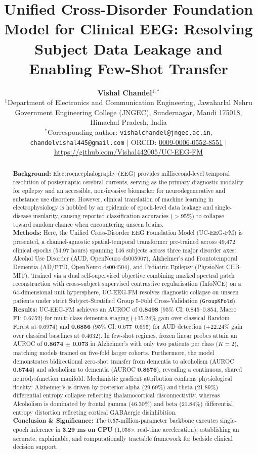 \documentclass[11pt,a4paper]{article}
\title{\textbf{\Large Unified Cross-Disorder Foundation Model for Clinical EEG: Resolving Subject Data Leakage and Enabling Few-Shot Transfer}}
\author{
    \textbf{Vishal Chandel}$^{1,*}$ \\[0.5em]
    \small $^{1}$Department of Electronics and Communication Engineering, Jawaharlal Nehru Government Engineering College (JNGEC), Sundernagar, Mandi 175018, Himachal Pradesh, India \\[0.2em]
    \small $^{*}$Corresponding author: \texttt{vishalchandel@jngec.ac.in}, \texttt{chandelvishal445@gmail.com} \quad $|$ \quad ORCID: \href{https://orcid.org/0009-0006-0552-8551}{0009-0006-0552-8551} \quad $|$ \quad \url{https://github.com/Vishal442005/UC-EEG-FM}
}
\date{}
\begin{document}
\maketitle
\thispagestyle{plain}

\begin{abstract}
\noindent\textbf{Background:} Electroencephalography (EEG) provides millisecond-level temporal resolution of postsynaptic cerebral currents, serving as the primary diagnostic modality for epilepsy and an accessible, non-invasive biomarker for neurodegenerative and substance use disorders. However, clinical translation of machine learning in electrophysiology is hobbled by an epidemic of epoch-level data leakage and single-disease insularity, causing reported classification accuracies ($>95\%$) to collapse toward random chance when encountering unseen brains. \\[0.4em]
\textbf{Methods:} Here, the Unified Cross-Disorder EEG Foundation Model (UC-EEG-FM) is presented, a channel-agnostic spatial-temporal transformer pre-trained across 49,472 clinical epochs (54.97 hours) spanning 146 subjects across three major disorder axes: Alcohol Use Disorder (AUD, OpenNeuro ds005907), Alzheimer’s and Frontotemporal Dementia (AD/FTD, OpenNeuro ds004504), and Pediatric Epilepsy (PhysioNet CHB-MIT). Trained via a dual self-supervised objective combining masked spectral patch reconstruction with cross-subject supervised contrastive regularisation (InfoNCE) on a 64-dimensional unit hypersphere, UC-EEG-FM resolves diagnostic collapse on unseen patients under strict Subject-Stratified Group 5-Fold Cross-Validation (\texttt{GroupKFold}). \\[0.4em]
\textbf{Results:} UC-EEG-FM achieves an AUROC of \textbf{0.8498} (95\% CI: 0.845--0.854, Macro F1: 0.6752) for multi-class dementia staging (+15.24\% gain over classical Random Forest at 0.6974) and \textbf{0.6856} (95\% CI: 0.677--0.695) for AUD detection (+22.24\% gain over classical baselines at 0.4632). In few-shot regimes, frozen linear probes attain an AUROC of \textbf{0.8674 $\pm$ 0.073} in Alzheimer’s with only two patients per class ($K = 2$), matching models trained on five-fold larger cohorts. Furthermore, the model demonstrates bidirectional zero-shot transfer from dementia to alcoholism (AUROC \textbf{0.6744}) and alcoholism to dementia (AUROC \textbf{0.8676}), revealing a continuous, shared neurodysfunction manifold. Mechanistic gradient attribution confirms physiological fidelity: Alzheimer's is driven by posterior alpha (29.69\%) and theta (21.89\%) differential entropy collapse reflecting thalamocortical disconnectivity, whereas Alcoholism is dominated by frontal gamma (46.30\%) and beta (21.84\%) differential entropy distortion reflecting cortical GABAergic disinhibition. \\[0.4em]
\textbf{Conclusion \& Significance:} The 0.57-million-parameter backbone executes single-epoch inference in \textbf{3.29 ms on CPU} (1,058$\times$ real-time acceleration), establishing an accurate, explainable, and computationally tractable framework for bedside clinical decision support.
\end{abstract}
\end{document}
